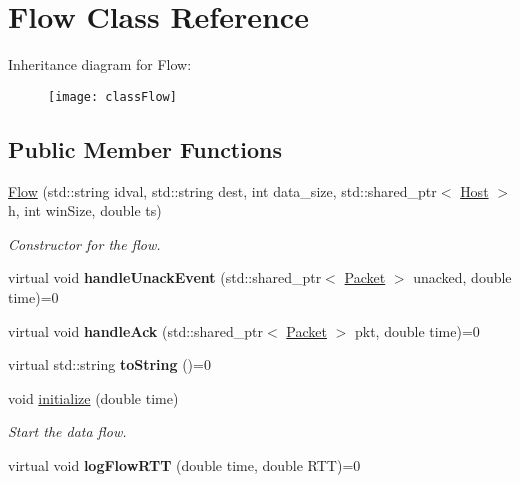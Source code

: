\hypertarget{classFlow}{\section{\-Flow \-Class \-Reference}
\label{classFlow}
}
\-Inheritance diagram for \-Flow\-:\begin{figure}[H]
\begin{center}
\leavevmode
\texttt{[image: classFlow]}
\end{center}
\end{figure}
\subsection*{\-Public \-Member \-Functions}
\begin{DoxyCompactItemize}
\item 
\hyperlink{classFlow_ab7771ce5ed20e19fff6bf6ceb5d1adc4}{\-Flow} (std\-::string idval, std\-::string dest, int data\-\_\-size, std\-::shared\-\_\-ptr$<$ \hyperlink{classHost}{\-Host} $>$ h, int win\-Size, double ts)
\begin{DoxyCompactList}\small\item\em \-Constructor for the flow. \end{DoxyCompactList}\item 
\hypertarget{classFlow_a8a45fd871502fad3fb23987ac773a0ab}{virtual void {\bfseries handle\-Unack\-Event} (std\-::shared\-\_\-ptr$<$ \hyperlink{classPacket}{\-Packet} $>$ unacked, double time)=0}\label{classFlow_a8a45fd871502fad3fb23987ac773a0ab}

\item 
\hypertarget{classFlow_ab75994d89f53573e60a1650dcaeddabb}{virtual void {\bfseries handle\-Ack} (std\-::shared\-\_\-ptr$<$ \hyperlink{classPacket}{\-Packet} $>$ pkt, double time)=0}\label{classFlow_ab75994d89f53573e60a1650dcaeddabb}

\item 
\hypertarget{classFlow_aa74099113ee1c2298874b85ade05be98}{virtual std\-::string {\bfseries to\-String} ()=0}\label{classFlow_aa74099113ee1c2298874b85ade05be98}

\item 
void \hyperlink{classFlow_a1076308c9b3a11a1e0bdea4c7b4c2966}{initialize} (double time)
\begin{DoxyCompactList}\small\item\em \-Start the data flow. \end{DoxyCompactList}\item 
\hypertarget{classFlow_a4e819e83edb2b9b90f647e6c43e28b8e}{virtual void {\bfseries log\-Flow\-R\-T\-T} (double time, double \-R\-T\-T)=0}\label{classFlow_a4e819e83edb2b9b90f647e6c43e28b8e}


\end{DoxyCompactItemize}

